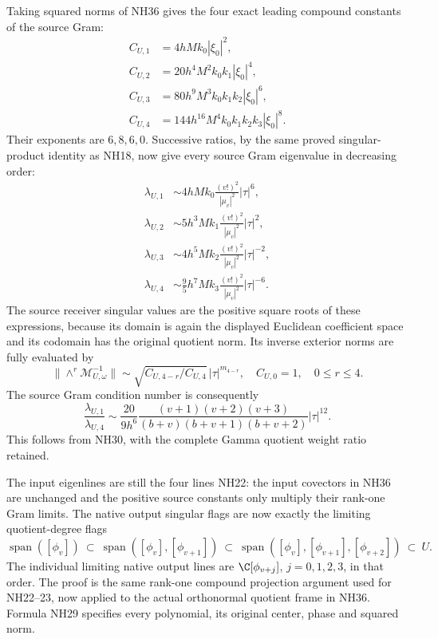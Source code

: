 Taking squared norms of NH36 gives the four exact leading
compound constants of the source Gram:
\[
\begin{aligned}
 C_{U,1}&=4hMk_0|\xi_0|^2,\\
 C_{U,2}&=20h^4M^2k_0k_1|\xi_0|^4,\\
 C_{U,3}&=80h^9M^3k_0k_1k_2|\xi_0|^6,\\
 C_{U,4}&=144h^{16}M^4k_0k_1k_2k_3|\xi_0|^8.
\end{aligned}\tag{NH37}
\]
Their exponents are $6,8,6,0$. Successive ratios, by the
same proved singular-product identity as NH18, now give
every source Gram eigenvalue in decreasing order:
\[
\boxed{\begin{aligned}
 \lambda_{U,1}&\sim4hMk_0\frac{(v!)^2}{|\mu_v|^2}|\tau|^6,\\
 \lambda_{U,2}&\sim5h^3Mk_1\frac{(v!)^2}{|\mu_v|^2}|\tau|^2,\\
 \lambda_{U,3}&\sim4h^5Mk_2\frac{(v!)^2}{|\mu_v|^2}|\tau|^{-2},\\
 \lambda_{U,4}&\sim\tfrac95h^7Mk_3\frac{(v!)^2}{|\mu_v|^2}|\tau|^{-6}.
\end{aligned}}\tag{NH38}
\]
The source receiver singular values are the positive square
roots of these expressions, because its domain is again
the displayed Euclidean coefficient space and its codomain
has the original quotient norm. Its inverse exterior norms
are fully evaluated by
\[
 \|\wedge^r\mathcal M_{U,\omega}^{-1}\|
 \sim\sqrt{C_{U,4-r}/C_{U,4}}\,
                         |\tau|^{m_{4-r}},
 \quad C_{U,0}=1,\quad 0\le r\le4.
 \tag{NH39}
\]
The source Gram condition number is consequently
\[
 \frac{\lambda_{U,1}}{\lambda_{U,4}}
 \sim\frac{20}{9h^6}
 \frac{(v+1)(v+2)(v+3)}{(b+v)(b+v+1)(b+v+2)}|\tau|^{12}.
 \tag{NH40}
\]
This follows from NH30, with the complete Gamma quotient
weight ratio retained.

The input eigenlines are still the four lines NH22: the
input covectors in NH36 are unchanged and the positive
source constants only multiply their rank-one Gram
limits. The native output singular flags are now exactly
the limiting quotient-degree flags
\[
 \operatorname{span}([\phi_v])\ \subset\
 \operatorname{span}([\phi_v],[\phi_{v+1}])\ \subset\
 \operatorname{span}([\phi_v],[\phi_{v+1}],[\phi_{v+2}])
 \ \subset\ U.
 \tag{NH41}
\]
The individual limiting native output lines are
$\C[\phi_{v+j}]$, $j=0,1,2,3$, in that order. The proof
is the same rank-one compound projection argument used
for NH22--23, now applied to the actual orthonormal
quotient frame in NH36. Formula NH29 specifies every
polynomial, its original center, phase and squared norm.

